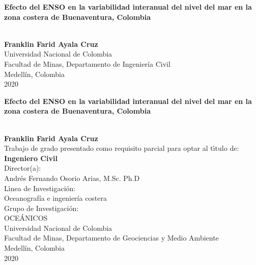 \begin{center}
\begin{figure}
\centering%
%
\end{figure}
\thispagestyle{empty} \vspace*{2.0cm} 
{\huge{\textbf{Efecto del ENSO en la variabilidad interanual del nivel del mar en la zona costera de Buenaventura, Colombia}}
	\par}\\[4.7cm]
\Large\textbf{Franklin Farid Ayala Cruz}\\[4.7cm]
\small Universidad Nacional de Colombia\\
Facultad de Minas, Departamento de Ingenier\'{i}a Civil\\
Medell\'{i}n, Colombia\\
2020\\
\end{center}


\newpage
\begin{center}
\thispagestyle{empty} \vspace*{0cm} 

{\huge{\textbf{Efecto del ENSO en la variabilidad interanual del nivel del mar en la zona costera de Buenaventura, Colombia}}
	\par} \\[2.5cm]

\Large\textbf{Franklin Farid Ayala Cruz}\\[2.3cm]
\small Trabajo de grado presentado como requisito parcial para optar al
t\'{\i}tulo de:\\
\textbf{Ingeniero Civil}\\[2.3cm]
Director(a):\\
Andrés Fernando Osorio Arias, M.Sc. Ph.D\\[2.0cm]
L\'{\i}nea de Investigaci\'{o}n:\\
Oceanograf\'{i}a e ingenier\'{i}a costera\\
Grupo de Investigaci\'{o}n:\\
OCE\'{A}NICOS\\[1.8cm]
Universidad Nacional de Colombia\\
Facultad de Minas, Departamento de Geociencias y Medio Ambiente\\
Medell\'{i}n, Colombia\\
2020\\
\end{center}

